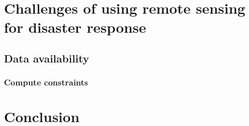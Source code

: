 \documentclass[conference,a4paper]{IEEEtran}
\begin{document}

\section{Challenges of using remote sensing for disaster response}

\subsection{Data availability}


\subsubsection{Compute constraints}


\section{Conclusion}




  
\end{document}
